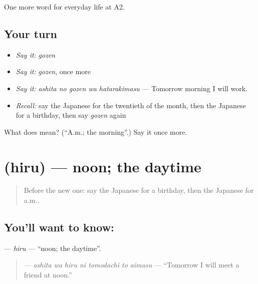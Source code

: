 \begin{grammarlens}[title={What you've built}]
One more word for everyday life at A2.
\end{grammarlens}

\subsection*{Your turn}
\begin{itemize}
\raggedright
  \item \emph{Say it:} \emph{gozen}
  \item \emph{Say it:} \emph{gozen}, once more
  \item \emph{Say it:} \emph{ashita no gozen wa hatarakimasu} — Tomorrow morning I will work.
  \item \emph{Recall:} say the Japanese for the twentieth of the month, then the Japanese for a birthday, then say \emph{gozen} again
\end{itemize}

\begin{tcolorbox}[breakable,colback=teal!4,colframe=teal!35!black,title={Before you move on}]
What does  mean? (\textquotedblleft{}A.m.; the morning\textquotedblright{}.) Say it once more.
\end{tcolorbox}
\section[\texorpdfstring{\ja{ひる} (hiru)}{ひる (hiru)}]{ (hiru) — noon; the daytime}

\label{lesson:JA-C166-hiru}



\begin{quote}
Before the new one: say the Japanese for a birthday, then the Japanese for a.m..
\end{quote}

\subsection*{You'll want to know: }
\textbf{} — \emph{hiru} — \textquotedblleft{}noon; the daytime\textquotedblright{}.

\begin{quote}
\textbf{   } — \emph{ashita wa hiru ni tomodachi to aimasu} — \textquotedblleft{}Tomorrow I will meet a friend at noon.\textquotedblright{}
\end{quote}

